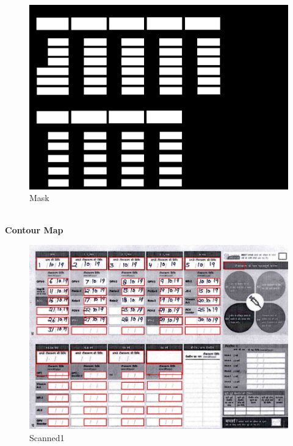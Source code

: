 \documentclass{article}
\begin{document}
    \begin{figure}[!htb]
    \minipage{\textwidth}
    \begin{center}
        \includegraphics[scale=.25]{4/lib/best.png}
      \caption{Mask}
    \end{center}
    \endminipage \hfill
    \end{figure}
\pagebreak\\
\textbf{Contour Map}
    \begin{figure}[!htb]
    \minipage{\textwidth}
    \begin{center}
      \includegraphics[scale=.25]{4/.report/_segmented/_cont/s1.jpg}
      \caption{Scanned1}
    \end{center}
    \endminipage
    \end{figure}
\end{document}
